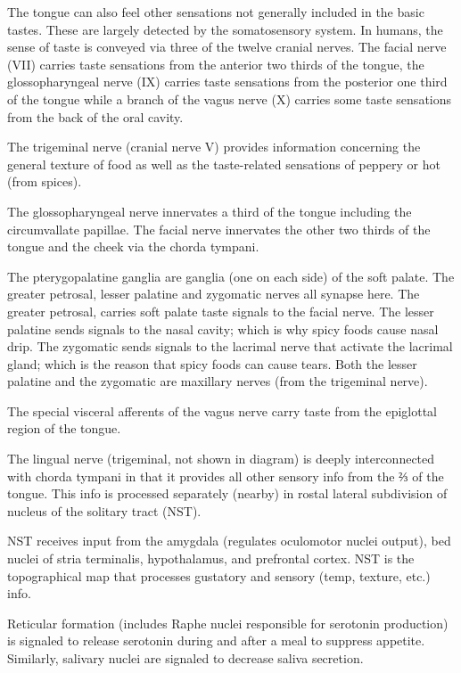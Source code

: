 \documentclass[]{book}
\begin{document}
The tongue can also feel other sensations not generally included in the basic tastes. These are largely detected by the somatosensory system. In humans, the sense of taste is conveyed via three of the twelve cranial nerves. The facial nerve (VII) carries taste sensations from the anterior two thirds of the tongue, the glossopharyngeal nerve (IX) carries taste sensations from the posterior one third of the tongue while a branch of the vagus nerve (X) carries some taste sensations from the back of the oral cavity.

The trigeminal nerve (cranial nerve V) provides information concerning the general texture of food as well as the taste-related sensations of peppery or hot (from spices).

The glossopharyngeal nerve innervates a third of the tongue including the circumvallate papillae. The facial nerve innervates the other two thirds of the tongue and the cheek via the chorda tympani.

The pterygopalatine ganglia are ganglia (one on each side) of the soft palate. The greater petrosal, lesser palatine and zygomatic nerves all synapse here. The greater petrosal, carries soft palate taste signals to the facial nerve. The lesser palatine sends signals to the nasal cavity; which is why spicy foods cause nasal drip. The zygomatic sends signals to the lacrimal nerve that activate the lacrimal gland; which is the reason that spicy foods can cause tears. Both the lesser palatine and the zygomatic are maxillary nerves (from the trigeminal nerve).

The special visceral afferents of the vagus nerve carry taste from the epiglottal region of the tongue.

The lingual nerve (trigeminal, not shown in diagram) is deeply interconnected with chorda tympani in that it provides all other sensory info from the ⅔ of the tongue. This info is processed separately (nearby) in rostal lateral subdivision of nucleus of the solitary tract (NST).

NST receives input from the amygdala (regulates oculomotor nuclei output), bed nuclei of stria terminalis, hypothalamus, and prefrontal cortex. NST is the topographical map that processes gustatory and sensory (temp, texture, etc.) info.

Reticular formation (includes Raphe nuclei responsible for serotonin production) is signaled to release serotonin during and after a meal to suppress appetite. Similarly, salivary nuclei are signaled to decrease saliva secretion.
\end{document}
